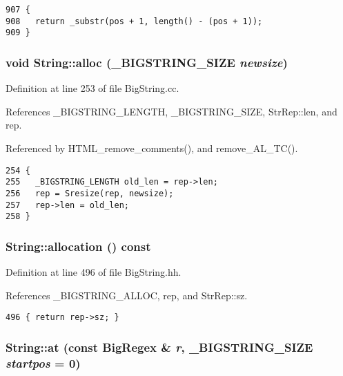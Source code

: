 \footnotesize\begin{verbatim}907 {
908   return _substr(pos + 1, length() - (pos + 1));
909 }
\end{verbatim}\normalsize 
{}
\subsubsection{\setlength{\rightskip}{0pt plus 5cm}void String::alloc ({\bf \_\-BIGSTRING\_\-SIZE} {\em newsize})}\label{classString_a107}




Definition at line 253 of file Big\-String.cc.

References \_\-BIGSTRING\_\-LENGTH, \_\-BIGSTRING\_\-SIZE, Str\-Rep::len, and rep.

Referenced by HTML\_\-remove\_\-comments(), and remove\_\-AL\_\-TC().



\footnotesize\begin{verbatim}254 {
255   _BIGSTRING_LENGTH old_len = rep->len;
256   rep = Sresize(rep, newsize);
257   rep->len = old_len;
258 }
\end{verbatim}\normalsize 
{}
\subsubsection{ String::allocation () const\hspace{0.3cm}{\tt  [inline]}}\label{classString_a108}




Definition at line 496 of file Big\-String.hh.

References \_\-BIGSTRING\_\-ALLOC, rep, and Str\-Rep::sz.



\footnotesize\begin{verbatim}496 { return rep->sz; }
\end{verbatim}\normalsize 
{}
\subsubsection{ String::at (const {\bf Big\-Regex} \& {\em r}, {\bf \_\-BIGSTRING\_\-SIZE} {\em startpos} = 0)}\label{classString_a57}




